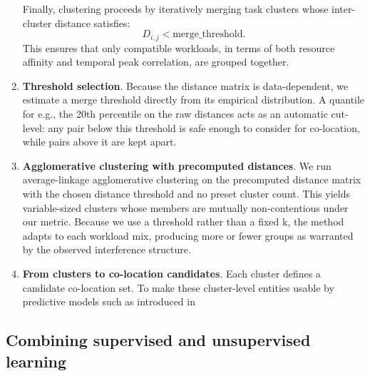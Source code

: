 \begin{enumerate}
          Finally, clustering proceeds by iteratively merging task clusters
          whose inter-cluster distance satisfies:
          \[
              D_{i,j} < \text{merge\_threshold}.
          \]
          This ensures that only compatible workloads, in terms of both
          resource affinity and temporal peak correlation, are grouped together.
    \item \textbf{Threshold selection}. Because the distance matrix is data-dependent, we estimate a merge threshold directly from its empirical distribution. A quantile for e.g., the 20th percentile on the raw distances acts as an automatic cut-level: any pair below this threshold is safe enough to consider for co-location, while pairs above it are kept apart.
    \item \textbf{Agglomerative clustering with precomputed distances}. We run average-linkage agglomerative clustering on the precomputed distance matrix with the chosen distance threshold and no preset cluster count. This yields variable-sized clusters whose members are mutually non-contentious under our metric. Because we use a threshold rather than a fixed k, the method adapts to each workload mix, producing more or fewer groups as warranted by the observed interference structure.
    \item\textbf{From clusters to co-location candidates}. Each cluster defines a candidate co-location set. To make these cluster-level entities usable by predictive models such as introduced in %
\end{enumerate}

\subsection{Combining supervised and unsupervised learning}
\label{sec:combining_supervised_and_unsupervised_learning}


